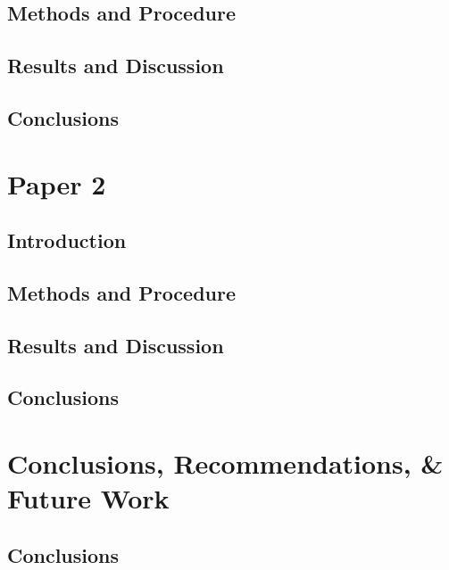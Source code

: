   \section{Methods and Procedure}\label{sec:P1methodsAndProcedure}
    \begin{case}
      \lipsum[10]
    \end{case}
    \begin{case}
      \lipsum[15]
    \end{case}
    \lipsum[46-48]
  \section{Results and Discussion}\label{sec:P1resultsAndDiscussion}
    \lipsum[55-57]
  \section{Conclusions}\label{sec:P1Conclusions}
    \lipsum[12-13]
                
\chapter{Paper 2}\label{ch:Paper2}
  \section{Introduction}\label{sec:P2Introduction}
    \lipsum[34-36]
  \section{Methods and Procedure}\label{sec:P2methodsAndProcedure}
    \lipsum[46-48]
  \section{Results and Discussion}\label{sec:P2resultsAndDiscussion}
    \lipsum[55-57]
  \section{Conclusions}\label{sec:P2Conclusions}
    \lipsum[12-13]
                
\chapter{Conclusions, Recommendations, \& Future Work}\label{ch:Conclusions}
  \section{Conclusions}\label{sec:Conclusions}
    \lipsum[34-36]
